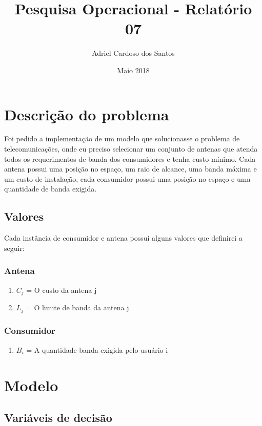 \documentclass{article}
\title{Pesquisa Operacional - Relatório 07}
\author{Adriel Cardoso dos Santos}
\date{Maio 2018}
\begin{document}
    \maketitle

    \section{Descrição do problema}

    Foi pedido a implementação de um modelo que solucionasse o problema de telecomunicações, onde eu preciso selecionar
    um conjunto de antenas que atenda todos os requerimentos de banda dos consumidores e tenha custo mínimo.
    Cada antena possui uma posição no espaço, um raio de alcance, uma banda máxima e um custo de instalação, cada consumidor
    possui uma posição no espaço e uma quantidade de banda exigida.

    \subsection{Valores}
    Cada instância de consumidor e antena possui alguns valores que definirei a seguir:

    \subsubsection{Antena}
    \begin{enumerate}
        \item $C_j$ = O custo da antena j
        \item $L_j$ = O limite de banda da antena j
    \end{enumerate}

    \subsubsection{Consumidor}
    \begin{enumerate}
        \item $B_i$ = A quantidade banda exigida pelo usuário i
    \end{enumerate}

    \section{Modelo}

    \subsection{Variáveis de decisão}
\end{document}
